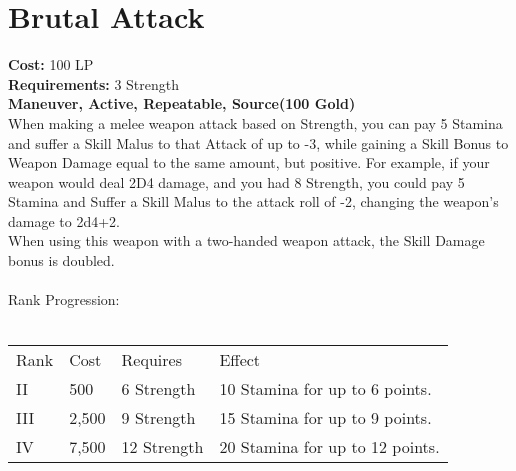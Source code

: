\section{Brutal Attack}\label{maneuver:brutalAttack}
\textbf{Cost:} 100 LP\\
\textbf{Requirements:} 3 Strength\\
\textbf{Maneuver, Active, Repeatable, Source(100 Gold)}\\
When making a melee weapon attack based on Strength, you can pay 5 Stamina and suffer a Skill Malus to that Attack of up to -3, while gaining a Skill Bonus to Weapon Damage equal to the same amount, but positive.
For example, if your weapon would deal 2D4 damage, and you had 8 Strength, you could pay 5 Stamina and Suffer a Skill Malus to the attack roll of -2, changing the weapon's damage to 2d4+2.\\
When using this weapon with a two-handed weapon attack, the Skill Damage bonus is doubled.\\
\\
Rank Progression:\\
\\
\begin{tabular}{l | l | l | l}
	Rank & Cost & Requires & Effect\\
	II & 500 & 6 Strength & 10 Stamina for up to 6 points.\\
	III & 2,500 & 9 Strength & 15 Stamina for up to 9 points.\\
	IV & 7,500 & 12 Strength & 20 Stamina for up to 12 points.\\
\end{tabular}